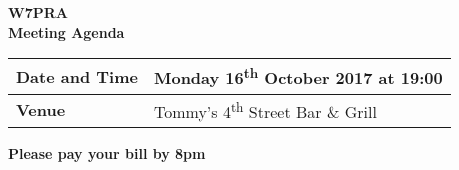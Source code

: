 \documentclass[letter,11pt]{extarticle}
\begin{document}
	\thispagestyle{empty}
	
	\begin{center}
		\textbf{W7PRA\\Meeting Agenda}
		\vspace{0.33cm}
	\end{center}
	
	\begin{center}
		\begin{tabular}{| m{3.0cm} | m{7.5cm} |} \hline
			\textbf{Date and Time} & Monday 16\textsuperscript{th} October 2017 at 19:00 \\ \hline
			\textbf{Venue} & Tommy's 4\textsuperscript{th} Street Bar \& Grill \\ \hline
				\end{tabular}
	\end{center}
	
	\begin{center}
		\textbf{Please pay your bill by 8pm}
	\end{center}
	
\end{document}
